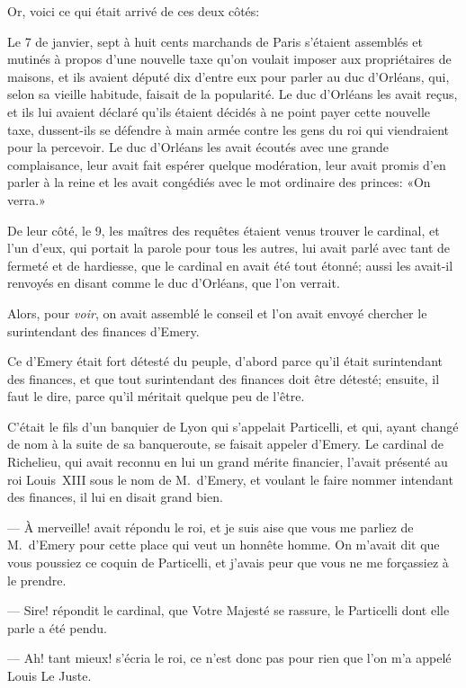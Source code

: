 Or, voici ce qui était arrivé de ces deux côtés:

Le 7 de janvier, sept à huit cents marchands de Paris s'étaient assemblés et mutinés à propos d'une nouvelle taxe qu'on voulait imposer aux propriétaires de maisons, et ils avaient député dix d'entre eux pour parler au duc d'Orléans, qui, selon sa vieille habitude, faisait de la popularité. Le duc d'Orléans les avait reçus, et ils lui avaient déclaré qu'ils étaient décidés à ne point payer cette nouvelle taxe, dussent-ils se défendre à main armée contre les gens du roi qui viendraient pour la percevoir. Le duc d'Orléans les avait écoutés avec une grande complaisance, leur avait fait espérer quelque modération, leur avait promis d'en parler à la reine et les avait congédiés avec le mot ordinaire des princes: «On verra.»

De leur côté, le 9, les maîtres des requêtes étaient venus trouver le cardinal, et l'un d'eux, qui portait la parole pour tous les autres, lui avait parlé avec tant de fermeté et de hardiesse, que le cardinal en avait été tout étonné; aussi les avait-il renvoyés en disant comme le duc d'Orléans, que l'on verrait.

Alors, pour \textit{voir}, on avait assemblé le conseil et l'on avait envoyé chercher le surintendant des finances d'Emery.

Ce d'Emery était fort détesté du peuple, d'abord parce qu'il était surintendant des finances, et que tout surintendant des finances doit être détesté; ensuite, il faut le dire, parce qu'il méritait quelque peu de l'être.

C'était le fils d'un banquier de Lyon qui s'appelait Particelli, et qui, ayant changé de nom à la suite de sa banqueroute, se faisait appeler d'Emery. Le cardinal de Richelieu, qui avait reconnu en lui un grand mérite financier, l'avait présenté au roi Louis~XIII sous le nom de M.~d'Emery, et voulant le faire nommer intendant des finances, il lui en disait grand bien.

— À merveille! avait répondu le roi, et je suis aise que vous me parliez de M.~d'Emery pour cette place qui veut un honnête homme. On m'avait dit que vous poussiez ce coquin de Particelli, et j'avais peur que vous ne me forçassiez à le prendre.

— Sire! répondit le cardinal, que Votre Majesté se rassure, le Particelli dont elle parle a été pendu.

— Ah! tant mieux! s'écria le roi, ce n'est donc pas pour rien que l'on m'a appelé Louis Le Juste.

